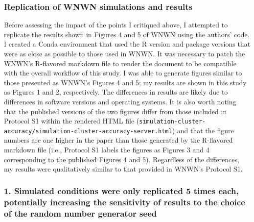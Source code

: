 \documentclass[
]{article}
\begin{document}
\hypertarget{replication-of-wnwn-simulations-and-results}{%
\subsubsection{Replication of WNWN simulations and
results}\label{replication-of-wnwn-simulations-and-results}}

Before assessing the impact of the points I critiqued above, I attempted
to replicate the results shown in Figures 4 and 5 of WNWN using the
authors' code. I created a Conda environment that used the R version and
package versions that were as close as possible to those used in WNWN.
It was necessary to patch the WNWN's R-flavored markdown file to render
the document to be compatible with the overall workflow of this study. I
was able to generate figures similar to those presented as WNWN's
Figures 4 and 5; my results are shown in this study as Figures 1 and 2,
respectively. The differences in results are likely due to differences
in software versions and operating systems. It is also worth noting that
the published versions of the two figures differ from those included in
Protocol S1 within the rendered HTML file
(\texttt{simulation-cluster-accuracy/simulation-cluster-accuracy-server.html})
and that the figure numbers are one higher in the paper than those
generated by the R-flavored markdown file (i.e., Protocol S1 labels the
figures as Figures 3 and 4 corresponding to the published Figures 4 and
5). Regardless of the differences, my results were qualitatively similar
to that provided in WNWN's Protocol S1.

\hypertarget{simulated-conditions-were-only-replicated-5-times-each-potentially-increasing-the-sensitivity-of-results-to-the-choice-of-the-random-number-generator-seed}{%
\subsubsection{1. Simulated conditions were only replicated 5 times
each, potentially increasing the sensitivity of results to the choice of
the random number generator
seed}\label{simulated-conditions-were-only-replicated-5-times-each-potentially-increasing-the-sensitivity-of-results-to-the-choice-of-the-random-number-generator-seed}}
\end{document}
